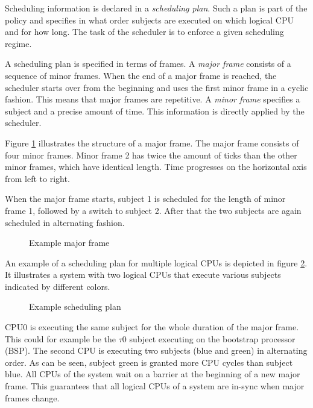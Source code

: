 Scheduling information is declared in a \emph{scheduling plan}. Such a plan is part of the policy and specifies in what order subjects
are executed on which logical CPU and for how long. The task of the scheduler is
to enforce a given scheduling regime.

A scheduling plan is specified in terms of frames. A \emph{major frame}
 consists of a sequence of minor frames. When the end of a
major frame is reached, the scheduler starts over from the beginning and uses
the first minor frame in a cyclic fashion. This means that major frames are
repetitive. A \emph{minor frame} specifies a subject and a
precise amount of time. This information is directly applied by the scheduler.

Figure \ref{fig:example-major-frame} illustrates the structure of a major frame.
The major frame consists of four minor frames. Minor frame 2 has twice the
amount of ticks than the other minor frames, which have identical length. Time
progresses on the horizontal axis from left to right.

When the major frame starts, subject 1 is scheduled for the length of minor
frame 1, followed by a switch to subject 2. After that the two subjects are
again scheduled in alternating fashion.

\begin{figure}[ht]
	\centering
	
	\caption{Example major frame}
	\label{fig:example-major-frame}
\end{figure}

An example of a scheduling plan for multiple logical CPUs is depicted in figure
\ref{fig:example-scheduling-plan}. It illustrates a system with two logical CPUs
that execute various subjects indicated by different colors.

\begin{figure}[ht]
	\centering
	
	\caption{Example scheduling plan}
	\label{fig:example-scheduling-plan}
\end{figure}

CPU0 is executing the same subject for the whole duration of the major frame.
This could for example be the $\tau$0 subject executing on the bootstrap
processor (BSP). The second CPU is executing two subjects (blue and green) in
alternating order. As can be seen, subject green is granted more CPU cycles than
subject blue. All CPUs of the system wait on a barrier at the beginning of a new
major frame.  This guarantees that all logical CPUs of a system are in-sync when
major frames change.

